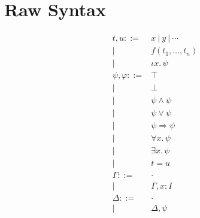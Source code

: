 \documentclass[11pt]{article}
\begin{document}
\section{Raw Syntax}

\newcommand{\I}{I}

\renewcommand{\t}{t}
\renewcommand{\u}{u}
\newcommand{\f}{f}
\newcommand{\x}{x}
\newcommand{\y}{y}
\newcommand{\tFun}[3]{#1({#2}_1,\ldots,{#2}_{#3})}
\newcommand{\tDesc}[3]{\iota #1.\, #3}

\newcommand{\p}{\psi}
\newcommand{\q}{\varphi}
\renewcommand{\r}{\phi}
\newcommand{\pTrue}{\top}
\newcommand{\pFalse}{\bot}
\newcommand{\pExists}[3]{\exists #1.\, #3}
\newcommand{\pForall}[3]{\forall #1.\, #3}
\newcommand{\pAnd}[2]{#1 \wedge #2}
\newcommand{\pOr}[2]{#1 \vee #2}
\newcommand{\pImply}[2]{#1 \Rightarrow #2}
\newcommand{\pEqual}[2]{#1 = #2}

\newcommand{\G}{\Gamma}
\newcommand{\D}{\Delta}
\newcommand{\emptyCtx}{\cdot}

\renewcommand{\wp}[1]{\mathop{\mathsf{wp}}(#1)}
\newcommand{\trans}[1]{\ulcorner #1 \urcorner}

\newcommand{\jwfterm}[4]{#1;#2 \vdash #3\, :\, #4}
\newcommand{\jwfprop}[3]{#1;#2 \vdash #3\, :\, \mathsf{Prop}}
\newcommand{\jpf}[3]{#1;#2 \vdash #3}

\newcommand{\wfterm}[4]{#1;#2 \triangleright #3\, :\, #4}
\newcommand{\wfprop}[3]{#1;#2 \triangleright #3\,:\, \mathsf{Prop}}
\newcommand{\pf}[3]{#1;#2 \triangleright #3}

\newcommand{\subst}[3]{#1[#2{\mapsto}#3]}

\[
\begin{array}{rl}
\t,\u ::= & \x\ |\ \y\ |\ \cdots\\
     | &\tFun{\f}{\t}{n}\\
     | &\tDesc{\x}{\I}{\p}\\[10pt]

\p,\q ::= &\pTrue\\
| & \pFalse\\
| & \pAnd{\p}{\p}\\
| & \pOr{\p}{\p}\\
| & \pImply{\p}{\p}\\
| & \pForall{\x}{\I}{\p}\\
| & \pExists{\x}{\I}{\p}\\
| & \pEqual{\t}{\u}\\[10pt]

\G ::= & \emptyCtx\\
       |& \G,\x{:}\I\\[10pt]

\D ::= & \emptyCtx\\
       |& \D,\p\\[10pt]

\end{array}
\]
\end{document}
